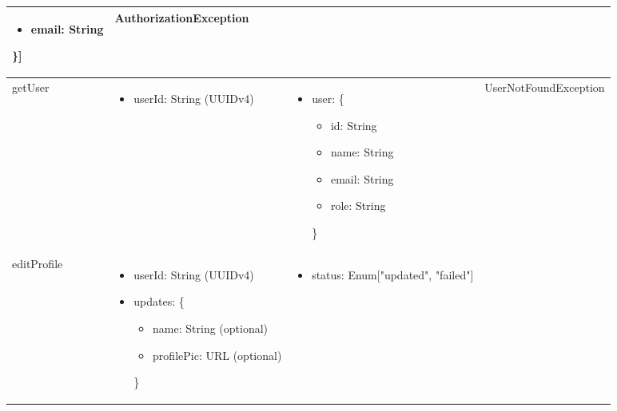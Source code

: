 \documentclass[12pt, titlepage]{article}
\begin{document}
\begin{center}
\begin{tabular}{p{2cm} p{4cm} p{2cm} p{4cm}}
\begin{minipage}{3.5cm}
\begin{itemize}[leftmargin=*,noitemsep]
\begin{itemize}[leftmargin=*,noitemsep]
        \item email: String
      \end{itemize}\}]
  \end{itemize}
  \end{minipage} & 
  AuthorizationException \\
  \hline
  getUser & 
  \begin{minipage}{3.5cm}
  \vspace{-0.2cm}
  \begin{itemize}[leftmargin=*,noitemsep]
    \item userId: String (UUIDv4)
  \end{itemize}
  \end{minipage} & 
  \begin{minipage}{3.5cm}
  \vspace{-0.2cm}
  \begin{itemize}[leftmargin=*,noitemsep]
    \item user: \{
      \begin{itemize}[leftmargin=*,noitemsep]
        \item id: String
        \item name: String
        \item email: String
        \item role: String
      \end{itemize}\}
  \end{itemize}
  \end{minipage} & 
  UserNotFoundException \\
  \hline
  editProfile & 
  \begin{minipage}{3.5cm}
  \vspace{-0.2cm}
  \begin{itemize}[leftmargin=*,noitemsep]
    \item userId: String (UUIDv4)
    \item updates: \{
      \begin{itemize}[leftmargin=*,noitemsep]
        \item name: String (optional)
        \item profilePic: URL (optional)
      \end{itemize}\}
  \end{itemize}
  \end{minipage} & 
  \begin{minipage}{3.5cm}
  \vspace{-0.2cm}
  \begin{itemize}[leftmargin=*,noitemsep]
    \item status: Enum["updated", "failed"]

\end{itemize}
\end{minipage}
\end{tabular}
\end{center}
\end{document}
